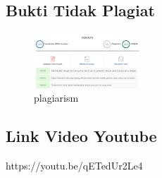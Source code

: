 \subsection{Bukti Tidak Plagiat}
\begin{figure}[H]
	\includegraphics[width=4cm]{figures/1174084/8/plagiarism.png}
	\centering
	\caption{plagiarism}
\end{figure}


\subsection{Link Video Youtube}
https://youtu.be/qETedUr2Le4
